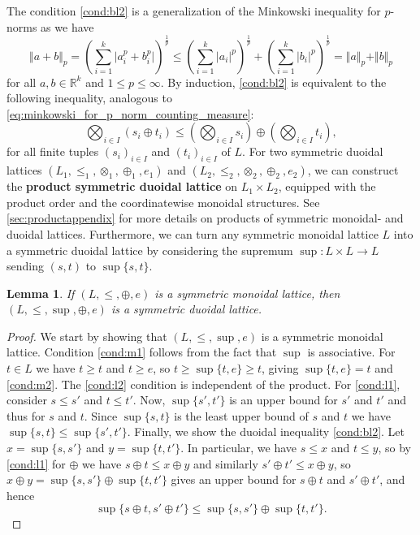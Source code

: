 \documentclass[a4paper,11pt]{article}
\newcommand{\tensor}{\otimes}
\newcommand{\bigtensor}{\bigotimes}
\newcommand{\atensor}{\oplus}
\newcounter{dummy}\numberwithin{dummy}{section}
\newtheorem{lemma}[dummy]{Lemma}
\theoremstyle{remark}
\begin{document}
The condition \ref{cond:bl2} is a generalization of the Minkowski inequality for $p$-norms as we have
\begin{equation}\label{eq:minkowski_for_p_norm_counting_measure}
    \Vert a+b\Vert_p=\left(\sum_{i=1}^k\vert a_i^p+b_i^p\vert\right)^\frac{1}{p}\leq\left(\sum_{i=1}^k\vert a_i\vert^p\right)^\frac{1}{p}+\left(\sum_{i=1}^k\vert b_i\vert^p\right)^\frac{1}{p}=\Vert a\Vert_p+\Vert b\Vert_p
\end{equation}
for all $a,b\in\mathbb{R}^k$ and $1\leq p\leq\infty$. By induction, \ref{cond:bl2} is equivalent to the following inequality, analogous to \cref{eq:minkowski_for_p_norm_counting_measure}:
\begin{equation*}
    \bigtensor_{i\in I}(s_i\atensor t_i)\leq \left(\bigtensor_{i\in I}s_i\right)\atensor\left(\bigtensor_{i\in I}t_i\right), 
\end{equation*}
for all finite tuples $(s_i)_{i\in I}$ and $(t_i)_{i\in I}$ of $L$. For two symmetric duoidal lattices $(L_1, \leq_1, \tensor_1,\atensor_1, e_1)$ and $(L_2, \leq_2, \tensor_2,\atensor_2, e_2)$, we can construct the \textbf{product symmetric duoidal lattice} on $L_1\times L_2$, equipped with the product order and the coordinatewise monoidal structures. See \cref{sec:productappendix} for more details on products of symmetric monoidal- and duoidal lattices. Furthermore, we can turn any symmetric monoidal lattice $L$ into a symmetric duoidal lattice by considering the supremum $\sup:L\times L\to L$ sending $(s,t)$ to $\sup\{s,t\}$.
\begin{lemma}\label{lemma:supbistructure}
    If $(L,\leq,\atensor,e)$ is a symmetric monoidal lattice, then $(L,\leq,\sup,\atensor,e)$ is a symmetric duoidal lattice.
\end{lemma}
\begin{proof}
    We start by showing that $(L,\leq,\sup,e)$ is a symmetric monoidal lattice. Condition \ref{cond:m1} follows from the fact that $\sup$ is associative. For $t\in L$ we have $t\geq t$ and $t\geq e$, so $t\geq\sup\{t,e\}\geq t$, giving $\sup\{t,e\}=t$ and \ref{cond:m2}. The \ref{cond:l2} condition is independent of the product. For \ref{cond:l1}, consider $s\leq s'$ and $t\leq t'$. Now, $\sup\{s',t'\}$ is an upper bound for $s'$ and $t'$ and thus for $s$ and $t$. Since $\sup\{s,t\}$ is the least upper bound of $s$ and $t$ we have $\sup\{s,t\}\leq \sup\{s',t'\}$. Finally, we show the duoidal inequality \ref{cond:bl2}. Let $x=\sup\{s,s'\}$ and $y=\sup\{t,t'\}$. In particular, we have $s\leq x$ and $t\leq y$, so by \ref{cond:l1} for $\atensor$ we have $s\atensor t\leq x\atensor y$ and similarly $s'\atensor t'\leq x\atensor y$, so $x\atensor y=\sup\{s,s'\} \atensor \sup\{t,t'\}$ gives an upper bound for $s\atensor t$ and $s'\atensor t'$, and hence
    \begin{equation}\label{eq:supminkowski}
        \sup\{s\atensor t, s'\atensor t'\}\leq \sup\{s,s'\} \atensor \sup\{t,t'\}.
    \end{equation}
\end{proof}
\end{document}
